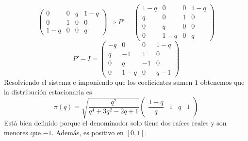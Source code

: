 \documentclass[twoside]{article}
\begin{document}
\begin{solucion}
\begin{itemize}
$$\begin{pmatrix}
0 	& 0	& q	& 1-q\\
0	& 1 & 0 & 0\\
1-q & 0 & 0 & q
\end{pmatrix} \Rightarrow 
P' =
\begin{pmatrix}
1-q	& 0 & 0 & 1-q\\
q 	& 0	& 1	& 0\\
0	& q & 0 & 0\\
0	& 1-q & 0 & q
\end{pmatrix}
$$
$$
P'-I = 
\begin{pmatrix}
-q	& 0 & 0 & 1-q\\
q 	& -1	& 1	& 0\\
0	& q & -1 & 0\\
0	& 1-q & 0 & q-1
\end{pmatrix}
$$
Resolviendo el sistema e imponiendo que los coeficientes sumen $1$ obtenemos que la distribución estacionaria es
$$
\pi(q) = \sqrt{\frac{q^2}{q^4+3q^2-2q+1}}
\begin{pmatrix}
\dfrac{1-q}{q} & 1 & q & 1
\end{pmatrix}
$$
Está bien definido porque el denominador solo tiene dos raíces reales y son menores que $-1$. Además, es positivo en $[0,1]$.	
\end{itemize}
\end{solucion}
\end{document}
